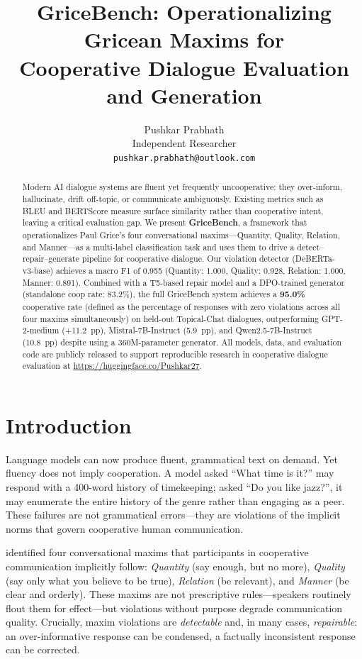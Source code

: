\documentclass[11pt]{article}
\title{GriceBench: Operationalizing Gricean Maxims for\\
Cooperative Dialogue Evaluation and Generation}
\author{
  Pushkar Prabhath \\
  Independent Researcher \\
  \texttt{pushkar.prabhath@outlook.com}
}
\begin{document}
\maketitle

\begin{abstract}
Modern AI dialogue systems are fluent yet frequently uncooperative:
they over-inform, hallucinate, drift off-topic, or communicate ambiguously.
Existing metrics such as BLEU and BERTScore measure surface similarity
rather than cooperative intent, leaving a critical evaluation gap.
We present \textbf{GriceBench}, a framework that operationalizes
Paul Grice's four conversational maxims---Quantity, Quality, Relation,
and Manner---as a multi-label classification task and uses them to drive
a detect--repair--generate pipeline for cooperative dialogue.
Our violation detector (DeBERTa-v3-base) achieves a macro F1 of 0.955 (Quantity: 1.000, Quality: 0.928, Relation: 1.000, Manner: 0.891).
Combined with a T5-based repair model and a DPO-trained generator (standalone coop rate: 83.2\%),
the full GriceBench system achieves a \textbf{95.0\%} cooperative rate 
(defined as the percentage of responses with zero violations across all four maxims simultaneously)
on held-out Topical-Chat dialogues, outperforming GPT-2-medium (+11.2~pp),
Mistral-7B-Instruct (5.9~pp), and Qwen2.5-7B-Instruct (10.8~pp)
despite using a 360M-parameter generator.
All models, data, and evaluation code are publicly released to support reproducible research in cooperative dialogue evaluation at
\url{https://huggingface.co/Pushkar27}.
\end{abstract}

\section{Introduction}
\label{sec:intro}

Language models can now produce fluent, grammatical text on demand.
Yet fluency does not imply cooperation.
A model asked ``What time is it?'' may respond with a 400-word history of timekeeping;
asked ``Do you like jazz?'', it may enumerate the entire history of the genre
rather than engaging as a peer.
These failures are not grammatical errors---they are violations of the implicit
norms that govern cooperative human communication.

\citet{grice1975logic} identified four conversational maxims that
participants in cooperative communication implicitly follow:
\textit{Quantity} (say enough, but no more),
\textit{Quality} (say only what you believe to be true),
\textit{Relation} (be relevant), and
\textit{Manner} (be clear and orderly).
These maxims are not prescriptive rules---speakers routinely flout them
for effect---but violations without purpose degrade communication quality.
Crucially, maxim violations are \textit{detectable} and, in many cases,
\textit{repairable}: an over-informative response can be condensed,
a factually inconsistent response can be corrected.
\end{document}
